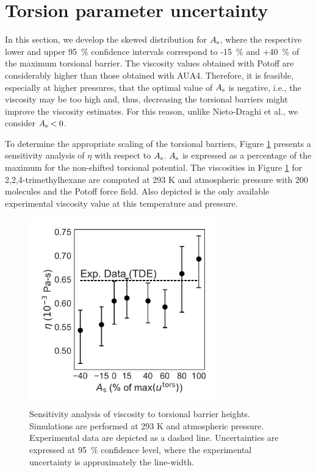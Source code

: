 \documentclass[preprint,review,11pt]{elsarticle}
\begin{document}
    \clearpage
	\newpage
	
    \section{Torsion parameter uncertainty} \label{SI:MCMC torsions}
	
%	
%	 
%	
%	
%	
	
	
	In this section, we develop the skewed distribution for $A_{\rm s}$, where the respective lower and upper 95~\% confidence intervals correspond to -15~\% and +40~\% of the maximum torsional barrier. The viscosity values obtained with Potoff are considerably higher than those obtained with AUA4. Therefore, it is feasible, especially at higher pressures, that the optimal value of $A_{\rm s}$ is negative, i.e., the viscosity may be too high and, thus, decreasing the torsional barriers might improve the viscosity estimates. For this reason, unlike Nieto-Draghi et al., we consider $A_{\rm s} < 0$.
	
	To determine the appropriate scaling of the torsional barriers, Figure \ref{fig:sensitivity_torsions} presents a sensitivity analysis of $\eta$ with respect to $A_{\rm s}$. $A_{\rm s}$ is expressed as a percentage of the maximum for the non-shifted torsional potential. The viscosities in Figure \ref{fig:sensitivity_torsions} for 2,2,4-trimethylhexane are computed at 293 K and atmospheric pressure with 200 molecules and the Potoff force field. Also depicted is the only available experimental viscosity value at this temperature and pressure. 	 
	
	\begin{figure}[htb!]
		\centering
				\includegraphics[width=3.2in]{sensitivity_torsions.pdf}
		\caption{Sensitivity analysis of viscosity to torsional barrier heights. Simulations are performed at 293 K and atmospheric pressure. Experimental data are depicted as a dashed line. Uncertainties are expressed at 95~\% confidence level, where the experimental uncertainty is approximately the line-width.}
		\label{fig:sensitivity_torsions}
	\end{figure}
	
\end{document}
